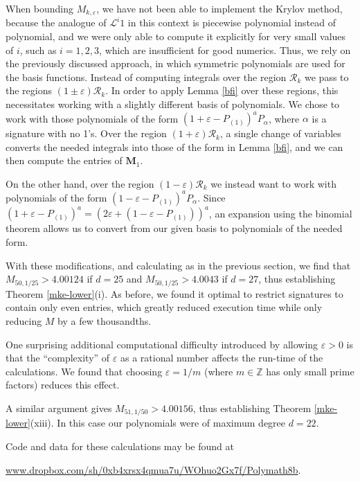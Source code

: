 \documentclass{bmcart}
\theoremstyle{plain}
\theoremstyle{definition}
\newcommand\Z{\mathbb{Z}}
\newcommand\eps{\varepsilon}
\begin{document}
When bounding $M_{k,\eps}$, we have not been able to implement the Krylov method, because the analogue of ${\mathcal L}^i 1$ in this context is piecewise polynomial instead of polynomial, and we were only able to compute it explicitly for very small values of $i$, such as $i=1,2,3$, which are insufficient for good numerics.  Thus, we rely on the previously discussed approach, in which symmetric polynomials are used for the basis functions.  Instead of computing integrals over the region ${\mathcal R}_k$ we pass to the regions $(1\pm \varepsilon)\mathcal{R}_k$.  In order to apply Lemma \ref{bfi} over these regions, this necessitates working with a slightly different basis of polynomials.  We chose to work with those polynomials of the form $(1+\varepsilon-P_{(1)})^a P_{\alpha}$, where $\alpha$ is a signature with no 1's.  Over the region $(1+\varepsilon)\mathcal{R}_k$, a single change of variables converts the needed integrals into those of the form in Lemma \ref{bfi}, and we can then compute the entries of $\mathbf{M}_1$.

On the other hand, over the region $(1-\varepsilon)\mathcal{R}_k$ we instead want to work with polynomials of the form $(1-\varepsilon-P_{(1)})^aP_{\alpha}$.  Since $(1+\varepsilon-P_{(1)})^a=(2\varepsilon +(1-\varepsilon-P_{(1)}))^a$, an expansion using the binomial theorem allows us to convert from our given basis to polynomials of the needed form.

With these modifications, and calculating as in the previous section, we find that $M_{50,1/25}>4.00124$ if $d=25$ and $M_{50,1/25}>4.0043$ if $d=27$, thus establishing Theorem \ref{mke-lower}(i).  As before, we found it optimal to restrict signatures to contain only even entries, which greatly reduced execution time while only reducing $M$ by a few thousandths.

One surprising additional computational difficulty introduced by allowing $\varepsilon>0$ is that the ``complexity'' of $\varepsilon$ as a rational number affects the run-time of the calculations.  We found that choosing $\varepsilon=1/m$ (where $m\in \Z$ has only small prime factors) reduces this effect.

A similar argument gives $M_{51,1/50} > 4.00156$, thus establishing Theorem \ref{mke-lower}(xiii). In this case our polynomials were of maximum degree $d= 22$.

Code and data for these calculations may be found at 

\centerline{\url{www.dropbox.com/sh/0xb4xrsx4qmua7u/WOhuo2Gx7f/Polymath8b}.}
\end{document}
